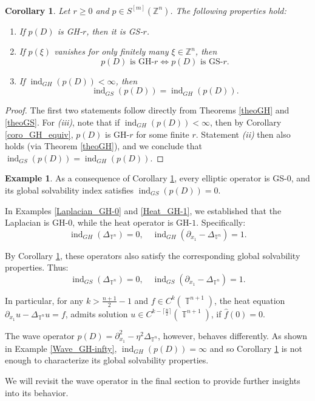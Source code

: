 \documentclass[11pt]{amsart}
\numberwithin{equation}{section}
\newtheorem{corollary}[theorem]{Corollary}
\theoremstyle{definition}
\newtheorem{example}[theorem]{Example}
\DeclareMathOperator{\T}{\mathbb{T}}
\begin{document}
      \
      
   \begin{corollary}\label{coroGHimpliesGS}
   	Let \(r\geq0\) and \( p \in S^{[m]}(\mathbb{Z}^n) \). The following properties hold:
   	\begin{enumerate}
   		\item[{\it (i)}] If \( p(D) \) is GH-\( r \), then it is GS-\( r \).
   		\item[{\it (ii)}] \smallskip If \( p(\xi) \) vanishes for only finitely many \( \xi \in \mathbb{Z}^n \), then 
   		\[ p(D)  \text{ is GH-}r \Longleftrightarrow   p(D)  \text{ is GS-}r. \]
   		\item[{\it (iii)}] If \( \operatorname{ind}_{GH}(p(D)) < \infty \), then 
   		\[ \operatorname{ind}_{GS}(p(D)) = \operatorname{ind}_{GH}(p(D)). \]
   	\end{enumerate}
   \end{corollary}
	
	\begin{proof}
		The first two statements follow directly from Theorems \ref{theoGH} and \ref{theoGS}.
		For {\it (iii)}, note that if \( \operatorname{ind}_{GH}(p(D)) < \infty \), then by Corollary \ref{coro_GH_equiv}, \( p(D) \) is GH-\( r \) for some finite \( r \). Statement {\it (ii)} then also holds  (via Theorem \ref{theoGH}), and we conclude that \( \operatorname{ind}_{GS}(p(D)) = \operatorname{ind}_{GH}(p(D)) \).
	\end{proof}

	\begin{example}
		As a consequence of Corollary \ref{coroGHimpliesGS}, every elliptic operator is GS-\( 0 \), and its global solvability index satisfies \( \operatorname{ind}_{GS}(p(D)) = 0 \).
		
		In Examples \ref{Laplacian_GH-0} and \ref{Heat_GH-1}, we established that the Laplacian is GH-\( 0 \), while the heat operator is GH-\( 1 \). Specifically:
		\[
		\operatorname{ind}_{GH}(\Delta_{\mathbb{T}^n}) = 0, \quad \operatorname{ind}_{GH}(\partial_{x_1} - \Delta_{\mathbb{T}^n}) = 1.
		\]
		
		By Corollary \ref{coroGHimpliesGS}, these operators also satisfy the corresponding global solvability properties. Thus:
		\[
		\operatorname{ind}_{GS}(\Delta_{\mathbb{T}^n}) = 0, \quad \operatorname{ind}_{GS}(\partial_{x_1} - \Delta_{\mathbb{T}^n}) = 1.
		\]

        In particular, for any $k>\frac{n+1}{2}-1$ and $f\in C^k(\T^{n+1})$, the heat equation $\partial_{x_1}u-\Delta_{\T^n}u=f$, admits solution $u\in C^{k-\lceil\frac{n}{2}\rceil}(\T^{n+1})$, if $\widehat{f}(0)=0$.  
        
		The wave operator \( p(D) = \partial_{x_1}^2 - \eta^2 \Delta_{\mathbb{T}^n} \), however, behaves differently. As shown in Example \ref{Wave_GH-infty}, \(\operatorname{ind}_{GH}(p(D)) = \infty\) and so Corollary \ref{coroGHimpliesGS} is not enough to characterize its global solvability properties.
		
		We will revisit the wave operator in the final section to provide further insights into its behavior.
	\end{example}
	
\end{document}
